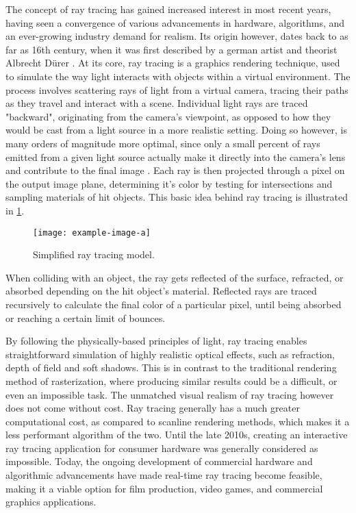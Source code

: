 The concept of ray tracing has gained increased interest in most recent years, having seen a convergence of various advancements in hardware, algorithms, and an ever-growing industry demand for realism.
Its origin however, dates back to as far as 16th century, when it was first described by a german artist and theorist Albrecht Dürer \supercite{Hofmann1990}.
At its core, ray tracing is a graphics rendering technique, used to simulate the way light interacts with objects within a virtual environment. 
The process involves scattering rays of light from a virtual camera, tracing their paths as they travel and interact with a scene. 
Individual light rays are traced "backward", originating from the camera's viewpoint, as opposed to how they would be cast from a light source in a more realistic setting.
Doing so however, is many orders of magnitude more optimal, since only a small percent of rays emitted from a given light source actually make it directly into the camera's lens and contribute to the final image \supercite{Glassner1989}.
Each ray is then projected through a pixel on the output image plane, determining it's color by testing for intersections and sampling materials of hit objects.
This basic idea behind ray tracing is illustrated in \cref{fig:Introduction/RayTracing/rt1}. 

\vfill
\begin{figure}[!ht]
    \centering
    \texttt{[image: example-image-a]}
    \caption[Simplified ray tracing model]{Simplified ray tracing model.}
    \label{fig:Introduction/RayTracing/rt1}
\end{figure}
\vfill

When colliding with an object, the ray gets reflected of the surface, refracted, or absorbed depending on the hit object's material. 
Reflected rays are traced recursively to calculate the final color of a particular pixel, until being absorbed or reaching a certain limit of bounces.  

By following the physically-based principles of light, ray tracing enables straightforward simulation of highly realistic optical effects, such as refraction, depth of field and soft shadows.
This is in contrast to the traditional rendering method of rasterization, where producing similar results could be a difficult, or even an impossible task. 
The unmatched visual realism of ray tracing however does not come without cost. 
Ray tracing generally has a much greater computational cost, as compared to scanline rendering methods, which makes it a less performant algorithm of the two.
Until the late 2010s, creating an interactive ray tracing application for consumer hardware was generally considered as impossible.
Today, the ongoing development of commercial hardware and algorithmic advancements have made real-time ray tracing become feasible, making it a viable option for film production, video games, and commercial graphics applications.

